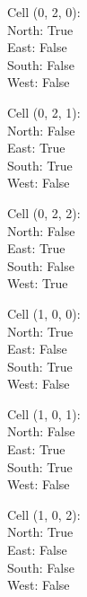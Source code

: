 \documentclass{article}
\begin{document}
\begin{multicols*}{3}
Cell (0, 2, 0):\\
\-\hspace{2cm}North: True\\
\-\hspace{2cm}East: False\\
\-\hspace{2cm}South: False\\
\-\hspace{2cm}West: False

Cell (0, 2, 1):\\
\-\hspace{2cm}North: False\\
\-\hspace{2cm}East: True\\
\-\hspace{2cm}South: True\\
\-\hspace{2cm}West: False

Cell (0, 2, 2):\\
\-\hspace{2cm}North: False\\
\-\hspace{2cm}East: True\\
\-\hspace{2cm}South: False\\
\-\hspace{2cm}West: True

Cell (1, 0, 0):\\
\-\hspace{2cm}North: True\\
\-\hspace{2cm}East: False\\
\-\hspace{2cm}South: True\\
\-\hspace{2cm}West: False

Cell (1, 0, 1):\\
\-\hspace{2cm}North: False\\
\-\hspace{2cm}East: True\\
\-\hspace{2cm}South: True\\
\-\hspace{2cm}West: False

Cell (1, 0, 2):\\
\-\hspace{2cm}North: True\\
\-\hspace{2cm}East: False\\
\-\hspace{2cm}South: False\\
\-\hspace{2cm}West: False


\end{multicols*}
\end{document}
